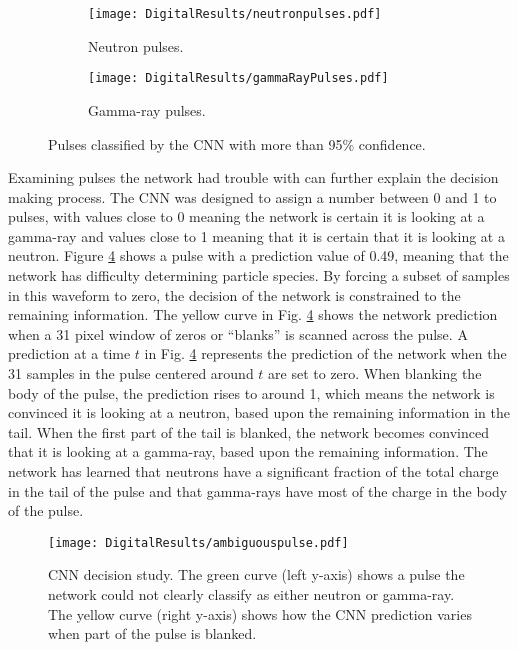 \documentclass[main.tex]{subfiles}
\begin{document}
\begin{figure}[h!]
\centering
\begin{subfigure}{.5\textwidth}
  \centering
  \texttt{[image: DigitalResults/neutronpulses.pdf]}
  \caption{Neutron pulses.}
  \label{fig:CNNneutron}
\end{subfigure}%
\begin{subfigure}{.5\textwidth}
  \centering
  \texttt{[image: DigitalResults/gammaRayPulses.pdf]}
  \caption{Gamma-ray pulses.}
  \label{fig:CNNgamma}
\end{subfigure}
\caption{Pulses classified by the CNN with more than 95\% confidence.}
\label{fig:CNN95}
\end{figure}

Examining pulses the network had trouble with can further explain the decision making process. The CNN was designed to assign a number between 0 and 1 to pulses, with values close to 0 meaning the network is certain it is looking at a gamma-ray and values close to 1 meaning that it is certain that it is looking at a neutron. 
Figure \ref{fig:occl} shows a pulse with a prediction value of 0.49, meaning that the network has difficulty determining particle species. By forcing a subset of samples in this waveform to zero, the decision of the network is constrained to the remaining information. The yellow curve in Fig. \ref{fig:occl} shows the network prediction when a 31 pixel window of zeros or ``blanks'' is scanned across the pulse. A prediction at a time $t$ in Fig. \ref{fig:occl} represents the prediction of the network when the 31 samples in the pulse centered around $t$ are set to zero. When blanking the body of the pulse, the prediction rises to around 1, which means the network is convinced it is looking at a neutron, based upon the remaining information in the tail. When the first part of the tail is blanked, the network becomes convinced that it is looking at a gamma-ray, based upon the remaining information. The network has learned that neutrons have a significant fraction of the total charge in the tail of the pulse and that gamma-rays have most of the charge in the body of the pulse.



\begin{figure}[ht!]
    \centering
        \texttt{[image: DigitalResults/ambiguouspulse.pdf]}
        \caption[CNN decision study.]{CNN decision study. The green curve (left y-axis) shows a pulse the network could not clearly classify as either neutron or gamma-ray. The yellow curve (right y-axis) shows how the CNN prediction varies when part of the pulse is blanked.}
    \label{fig:occl} 
\end{figure}
\end{document}

